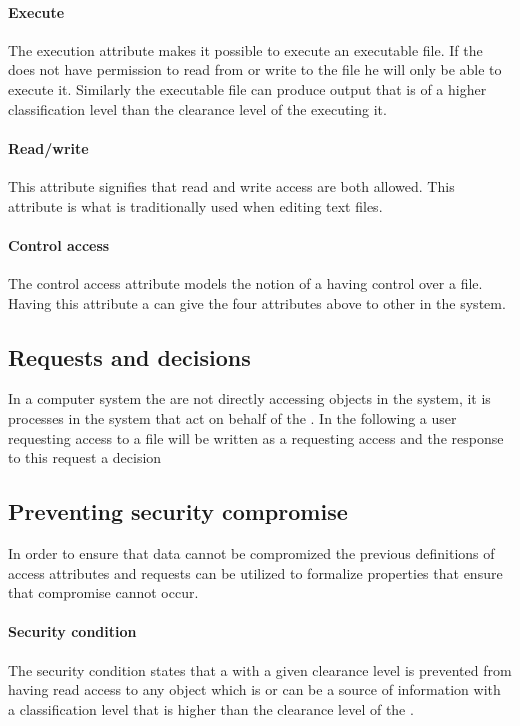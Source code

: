 \paragraph{Execute}
The execution attribute makes it possible to execute an executable file.
If the \principal{} does not have permission to read from or write to the file he will only be able to execute it.
Similarly the executable file can produce output that is of a higher classification level than the clearance level of the \principal{} executing it.

\paragraph{Read/write}
This attribute signifies that read and write access are both allowed.
This attribute is what is traditionally used when editing text files.

\paragraph{Control access}
The control access attribute models the notion of a \principal{} having control over a file.
Having this attribute a \principal{} can give the four attributes above to other \principals{} in the system.

\subsection{Requests and decisions}
In a computer system the \principals{} are not directly accessing objects in the system, it is processes in the system that act on behalf of the \principal{}.
In the following a user requesting access to a file will be written as a \principal{} requesting access and the response to this request a decision

\subsection{Preventing security compromise}\label{bellap:properties}
In order to ensure that data cannot be compromized the previous definitions of access attributes and requests can be utilized to formalize properties that ensure that compromise cannot occur.

\paragraph{Security condition}
The security condition states that a \principal{} with a given clearance level is prevented from having read access to any object which is or can be a source of information with a classification level that is higher than the clearance level of the \principal{}.

